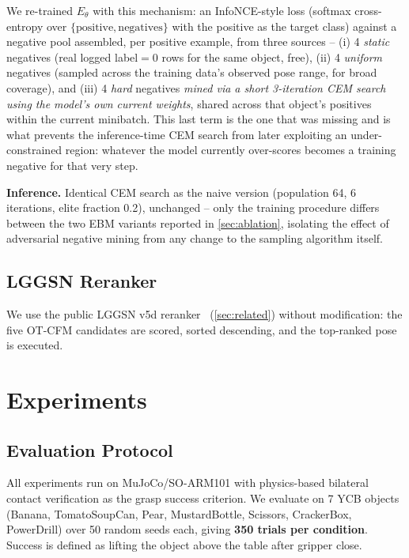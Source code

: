 \documentclass[journal]{IEEEtran}
\begin{document}
We re-trained $E_\theta$ with this mechanism: an InfoNCE-style loss
(softmax cross-entropy over $\{\text{positive}, \text{negatives}\}$ with the
positive as the target class) against a negative pool assembled, per
positive example, from three sources -- (i) 4 \emph{static} negatives (real
logged label$=$0 rows for the same object, free), (ii) 4 \emph{uniform}
negatives (sampled across the training data's observed pose range, for
broad coverage), and (iii) 4 \emph{hard} negatives \emph{mined via a short
3-iteration CEM search using the model's own current weights}, shared across
that object's positives within the current minibatch. This last term is the
one that was missing and is what prevents the inference-time CEM search from
later exploiting an under-constrained region: whatever the model currently
over-scores becomes a training negative for that very step.

\noindent\textbf{Inference.} Identical CEM search as the naive version
(population 64, 6 iterations, elite fraction 0.2), unchanged -- only the
training procedure differs between the two EBM variants reported in
\cref{sec:ablation}, isolating the effect of adversarial negative mining
from any change to the sampling algorithm itself.

\subsection{LGGSN Reranker}

We use the public LGGSN v5d reranker~\cite{owg2024} (\cref{sec:related})
without modification: the five OT-CFM candidates are scored, sorted
descending, and the top-ranked pose is executed.

\section{Experiments}
\label{sec:experiments}

\subsection{Evaluation Protocol}

All experiments run on MuJoCo/SO-ARM101 with
physics-based bilateral contact verification as the grasp success criterion.
We evaluate on 7 YCB objects (Banana, TomatoSoupCan, Pear, MustardBottle,
Scissors, CrackerBox, PowerDrill) over 50 random seeds each,
giving \textbf{350 trials per condition}.
Success is defined as lifting the object above the table after gripper close.
\end{document}
